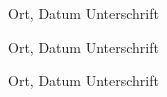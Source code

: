 \documentclass[12pt,toc=bib,toc=listof]{scrreprt}
\newcommand{\studentnameA}{Suphi Pembe}
\newcommand{\studentpartA}{SEITEN oder KAPITEL VON BIS 1}
\newcommand{\studentnameB}{Andreas Würzer}
\newcommand{\studentpartB}{SEITEN oder KAPITEL VON BIS 2}
\newcommand{\studentnameC}{Christian Nguyen}
\newcommand{\studentpartC}{SEITEN oder KAPITEL VON BIS 3}
\begin{document}
\vspace{1cm}
\noindent
\\
\\

\vspace{3cm}
Ort, Datum \hfill Unterschrift

\vspace{2cm}
Ort, Datum \hfill Unterschrift

\vspace{2cm}
Ort, Datum \hfill Unterschrift
\end{document}
